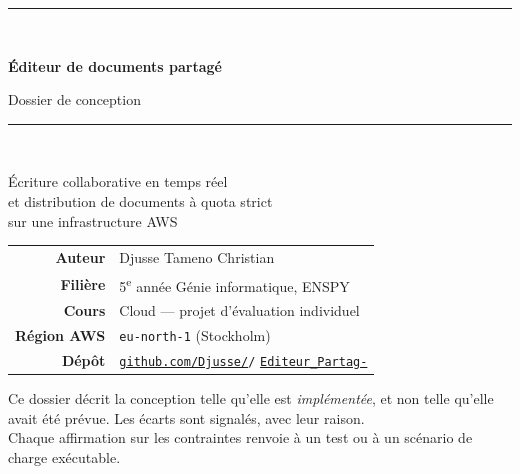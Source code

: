 \documentclass[11pt,a4paper]{article}
\newcommand{\code}[1]{\texttt{#1}}
\begin{document}
\begin{titlepage}
  \centering
  \vspace*{2.5cm}

  {\color{accent}\rule{\linewidth}{1.2pt}}\\[0.6cm]
  {\Huge\bfseries Éditeur de documents partagé\par}
  \vspace{0.4cm}
  {\Large Dossier de conception\par}
  \vspace{0.3cm}
  {\color{accent}\rule{\linewidth}{1.2pt}}\\[1.2cm]

  {\large Écriture collaborative en temps réel\\
  et distribution de documents à quota strict\\[0.3cm]
  sur une infrastructure AWS\par}

  \vspace{2.2cm}

  \begin{tabular}{@{}rl@{}}
    \textbf{Auteur} & Djusse Tameno Christian \\[0.2cm]
    \textbf{Filière} & 5\textsuperscript{e} année Génie informatique, ENSPY \\[0.2cm]
    \textbf{Cours} & Cloud — projet d'évaluation individuel \\[0.2cm]
    \textbf{Région AWS} & \code{eu-north-1} (Stockholm) \\[0.2cm]
    \textbf{Dépôt} & \href{https://github.com/Djusse/Editeur_Partag-}%
                       {\texttt{github.com/Djusse/}}\texttt{/}%
                       \href{https://github.com/Djusse/Editeur_Partag-}%
                       {\texttt{Editeur\_Partag-}} \\
  \end{tabular}

  \vfill

  {\small\color{attenue}
    Ce dossier décrit la conception telle qu'elle est \emph{implémentée}, et non
    telle qu'elle avait été prévue. Les écarts sont signalés, avec leur raison.\\
    Chaque affirmation sur les contraintes renvoie à un test ou à un scénario
    de charge exécutable.\par}
\end{titlepage}

\tableofcontents
\newpage

\listoffigures
\listoftables
\newpage





\end{document}
